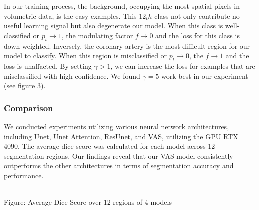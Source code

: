 \documentclass{article}
\begin{document}
\begin{multicols}{2}
In our training process, the background, occupying the most spatial pixels in volumetric data, is the easy examples. This $12_th$ class not only contribute no useful learning signal but also degenerate our model. When this class is well-classified or $p_t \rightarrow 1$, the modulating factor $f \rightarrow 0$ and the loss for this class is down-weighted. Inversely, the coronary artery is the most difficult region for our model to classify. When this region is misclassified or $p_t \rightarrow 0$, the $f \rightarrow 1$ and the loss is unaffacted. By setting $\gamma > 1$, we can increase the loss for examples that are misclassified with high confidence. We found $\gamma = 5$ work best in our experiment (see figure 3). \\

\subsubsection{Comparison}
We conducted experiments utilizing various neural network architectures, including Unet, Unet Attention, ResUnet, and VAS, utilizing the GPU RTX 4090. The average dice score was calculated for each model across 12 segmentation regions. Our findings reveal that our VAS model consistently outperforms the other architectures in terms of segmentation accuracy and performance. 

 \\
Figure: Average Dice Score over 12 regions of 4 models \\



\end{multicols}
\end{document}
